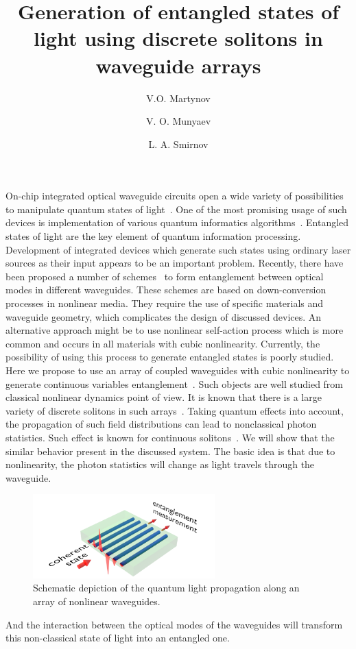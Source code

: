 \documentclass[9pt,twocolumn,twoside]{osajnl}
\title{Generation of entangled states of light using discrete solitons in waveguide arrays}
\author[1,*]{V.O. Martynov}
\author[2]{V. O. Munyaev}
\author[1,2]{L. A. Smirnov}
\affil[1]{Institute of Applied Physics of the Russian Academy of Sciences, Nizhny Novgorod, 603950, Russia}
\affil[2]{Department of Control Theory, Nizhny Novgorod State University, Nizhny Novgorod, 603950, Russia}
\affil[*]{Corresponding author: martvo@ipfran.ru}
\begin{document}
\maketitle

On-chip integrated optical waveguide circuits open a wide variety of possibilities to manipulate quantum states of light~\cite{zoubi_quantum_2017, silverstone_-chip_2014, matthews_manipulation_2009, kruse_dual-path_2015}. 
One of the most promising usage of such devices is implementation of various quantum informatics algorithms~\cite{nielsen_quantum_2000}. Entangled states of light are the key element of quantum information processing. 
Development of integrated devices which generate such states using ordinary laser sources as their input appears to be an important problem. 
Recently, there have been proposed a number of schemes~\cite{belsley_generating_2020, guo_parametric_2017, caspani_integrated_2017, solntsev_path-entangled_2017, yang_manipulation_2014} to form entanglement between optical modes in different waveguides. 
These schemes are based on down-conversion processes in nonlinear media. 
They require the use of specific materials and waveguide geometry, which complicates the design of discussed devices. 
An alternative approach might be to use nonlinear self-action process which is more common and occurs in all materials with cubic nonlinearity. 
Currently, the possibility of using this process to generate entangled states is poorly studied. 
Here we propose to use an array of coupled waveguides with cubic nonlinearity to generate continuous variables entanglement~\cite{weedbrook_gaussian_2012}. 
Such objects are well studied from classical nonlinear dynamics point of view. 
It is known that there is a large variety of discrete solitons in such arrays~\cite{kevrekidis_discrete_2009, christodoulides_discretizing_2003}.
Taking quantum effects into account, the propagation of such field distributions can lead to nonclassical photon statistics. 
Such effect is known for continuous solitons~\cite{corney_quantum_2001, lai_entangled_2009}.
We will show that the similar behavior present in the discussed system.
The basic idea is that due to nonlinearity, the photon statistics will change as light travels through the waveguide.
\begin{figure}[h!]
	\centering\includegraphics[width=7cm]{fig1}
	\caption{Schematic depiction of the quantum light propagation along an array of nonlinear waveguides.}
	\label{fig:schema}
\end{figure}
And the interaction between the optical modes of the waveguides will transform this non-classical state of light into an entangled one. 
\end{document}
